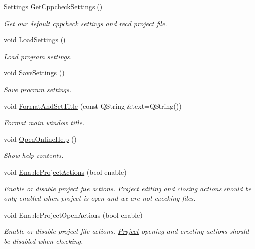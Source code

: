 \begin{DoxyCompactItemize}
\hyperlink{class_settings}{Settings} \hyperlink{class_main_window_a480919da65f763252bce15d2b216bab8}{Get\-Cppcheck\-Settings} ()
\begin{DoxyCompactList}\small\item\em Get our default cppcheck settings and read project file. \end{DoxyCompactList}\item 
void \hyperlink{class_main_window_a441f3ca9b506380fe4f8d8fe37e23ec8}{Load\-Settings} ()
\begin{DoxyCompactList}\small\item\em Load program settings. \end{DoxyCompactList}\item 
void \hyperlink{class_main_window_a892aa0e1c246711d3008408313e9d08d}{Save\-Settings} ()
\begin{DoxyCompactList}\small\item\em Save program settings. \end{DoxyCompactList}\item 
void \hyperlink{class_main_window_a734cd099d2287bcdb2d1f7de062ec1e4}{Format\-And\-Set\-Title} (const Q\-String \&text=Q\-String())
\begin{DoxyCompactList}\small\item\em Format main window title. \end{DoxyCompactList}\item 
void \hyperlink{class_main_window_ae14c878212f07e64b4fcfd5c40eb5a67}{Open\-Online\-Help} ()
\begin{DoxyCompactList}\small\item\em Show help contents. \end{DoxyCompactList}\item 
void \hyperlink{class_main_window_af82abb3175a1787ec1f0d5b389dd4ab9}{Enable\-Project\-Actions} (bool enable)
\begin{DoxyCompactList}\small\item\em Enable or disable project file actions. \hyperlink{class_project}{Project} editing and closing actions should be only enabled when project is open and we are not checking files. \end{DoxyCompactList}\item 
void \hyperlink{class_main_window_a70b6dfd00c947fe2f813caf8a6bf0658}{Enable\-Project\-Open\-Actions} (bool enable)
\begin{DoxyCompactList}\small\item\em Enable or disable project file actions. \hyperlink{class_project}{Project} opening and creating actions should be disabled when checking. \end{DoxyCompactList}\item 

\end{DoxyCompactItemize}

